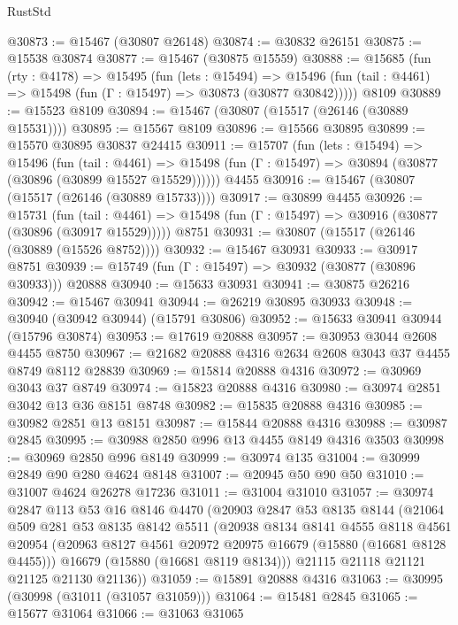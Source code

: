 \begin{lexlean}{RustStd}
\begin{coremodule}
@30873 := @15467 (@30807 @26148)
@30874 := @30832 @26151
@30875 := @15538 @30874
@30877 := @15467 (@30875 @15559)
@30888 := @15685
    (fun (rty : @4178) =>
    @15495
      (fun (lets : @15494) =>
      @15496 (fun (tail : @4461) => @15498 (fun (Γ : @15497) => @30873 (@30877 @30842)))))
    @8109
@30889 := @15523 @8109
@30894 := @15467 (@30807 (@15517 (@26146 (@30889 @15531))))
@30895 := @15567 @8109
@30896 := @15566 @30895
@30899 := @15570 @30895 @30837 @24415
@30911 := @15707
    (fun (lets : @15494) =>
    @15496
      (fun (tail : @4461) =>
      @15498 (fun (Γ : @15497) => @30894 (@30877 (@30896 (@30899 @15527 @15529))))))
    @4455
@30916 := @15467 (@30807 (@15517 (@26146 (@30889 @15733))))
@30917 := @30899 @4455
@30926 := @15731
    (fun (tail : @4461) => @15498 (fun (Γ : @15497) => @30916 (@30877 (@30896 (@30917 @15529)))))
    @8751
@30931 := @30807 (@15517 (@26146 (@30889 (@15526 @8752))))
@30932 := @15467 @30931
@30933 := @30917 @8751
@30939 := @15749 (fun (Γ : @15497) => @30932 (@30877 (@30896 @30933))) @20888
@30940 := @15633 @30931
@30941 := @30875 @26216
@30942 := @15467 @30941
@30944 := @26219 @30895 @30933
@30948 := @30940 (@30942 @30944) (@15791 @30806)
@30952 := @15633 @30941 @30944 (@15796 @30874)
@30953 := @17619 @20888
@30957 := @30953 @3044 @2608 @4455 @8750
@30967 := @21682 @20888 @4316 @2634 @2608 @3043 @37 @4455 @8749 @8112 @28839
@30969 := @15814 @20888 @4316
@30972 := @30969 @3043 @37 @8749
@30974 := @15823 @20888 @4316
@30980 := @30974 @2851 @3042 @13 @36 @8151 @8748
@30982 := @15835 @20888 @4316
@30985 := @30982 @2851 @13 @8151
@30987 := @15844 @20888 @4316
@30988 := @30987 @2845
@30995 := @30988 @2850 @996 @13 @4455 @8149 @4316 @3503
@30998 := @30969 @2850 @996 @8149
@30999 := @30974 @135
@31004 := @30999 @2849 @90 @280 @4624 @8148
@31007 := @20945 @50 @90 @50
@31010 := @31007 @4624 @26278 @17236
@31011 := @31004 @31010
@31057 := @30974
    @2847
    @113
    @53
    @16
    @8146
    @4470
    (@20903
      @2847
      @53
      @8135
      @8144
      (@21064
        @509
        @281
        @53
        @8135
        @8142
        @5511
        (@20938
          @8134
          @8141
          @4555
          @8118
          @4561
          @20954
          (@20963 @8127 @4561 @20972 @20975 @16679 (@15880 (@16681 @8128 @4455)))
          @16679
          (@15880 (@16681 @8119 @8134)))
        @21115
        @21118
        @21121
        @21125
        @21130
        @21136))
@31059 := @15891 @20888 @4316
@31063 := @30995 (@30998 (@31011 (@31057 @31059)))
@31064 := @15481 @2845
@31065 := @15677 @31064
@31066 := @31063 @31065

\end{coremodule}
\end{lexlean}
